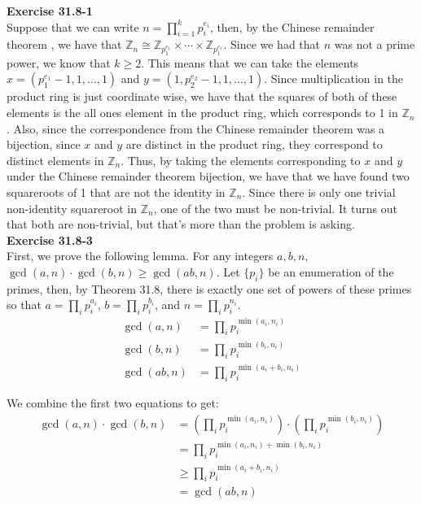 \documentclass{article}
\newcommand{\Z}{\mathbb{Z}}
\begin{document}
\noindent\textbf{Exercise 31.8-1}\\
Suppose that we can write $n = \prod_{i=1}^k p_i^{e_i}$, then, by the Chinese remainder theorem , we have that $\Z_n \cong \Z_{p_1^{e_1}} \times \cdots \times \Z_{p_1^{e_1}}$. Since we had that $n$ was not a prime power, we know that $k\ge 2$. This means that we can take the elements $x = (p_1^{e_1} -1, 1, \ldots ,1)$ and $y =(1,p_2^{e_2} -1,1,\ldots ,1)$. Since multiplication in the product ring is just coordinate wise, we have that the squares of both of these elements is the all ones element in the product ring, which corresponds to 1 in $\Z_n$. Also, since the correspondence from the Chinese remainder theorem was a bijection, since $x$ and $y$ are distinct in the product ring, they correspond to distinct elements in $\Z_n$. Thus, by taking the elements corresponding to $x$ and $y$ under the Chinese remainder theorem bijection, we have that we have found two squareroots of 1 that are not the identity in $\Z_n$. Since there is only one trivial non-identity squareroot in $\Z_n$, one of the two must be non-trivial. It turns out that both are non-trivial, but that's more than the problem is asking.\\



\noindent\textbf{Exercise 31.8-3}\\

First, we prove the following lemma. For any integers $a,b,n$, $\gcd(a,n) \cdot \gcd(b,n) \ge \gcd(ab,n)$. Let $\{p_i\}$ be an enumeration of the primes, then, by Theorem 31.8, there is exactly one set of powers of these primes so that $a = \prod_{i} p_i^{a_i}$, $b = \prod_{i} p_i^{b_i}$, and $n = \prod_{i} p_i^{n_i}$. 
\begin{align*}
\gcd(a,n) &= \prod_i p_i^{\min(a_i,n_i)}\\
\gcd(b,n) &= \prod_i p_i^{\min(b_i,n_i)}\\
\gcd(ab,n) &= \prod_i p_i^{\min(a_i+b_i,n_i)}
\end{align*}

We combine the first two equations to get:
\begin{align*}
\gcd(a,n)\cdot \gcd(b,n) &= \left(\prod_i p_i^{\min(a_i,n_i)}\right) \cdot\left( \prod_i p_i^{\min(b_i,n_i)}\right)\\
 &= \prod_i p_i^{\min(a_i,n_i) + \min(b_i,n_i)}\\
 &\ge \prod_i p_i^{\min(a_i+b_i,n_i)}\\
 &= \gcd(ab,n)
\end{align*}
\end{document}
